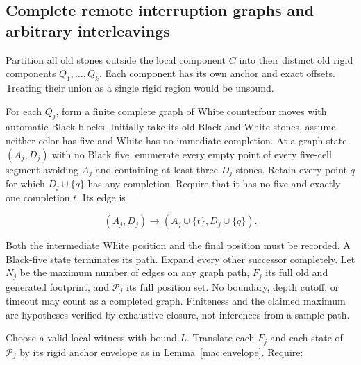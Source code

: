 \documentclass[11pt]{article}
\theoremstyle{definition}
\theoremstyle{remark}
\begin{document}
\subsection{Complete remote interruption graphs and arbitrary interleavings}\label{mac:interruption-section}

Partition all old stones outside the local component \(C\) into their distinct old rigid components \(Q_1,\ldots,Q_k\). Each component has its own anchor and exact offsets. Treating their union as a single rigid region would be unsound.

For each \(Q_j\), form a finite complete graph of White counterfour moves with automatic Black blocks. Initially take its old Black and White stones, assume neither color has five and White has no immediate completion. At a graph state \((A_j,D_j)\) with no Black five, enumerate every empty point of every five-cell segment avoiding \(A_j\) and containing at least three \(D_j\) stones. Retain every point \(q\) for which \(D_j\cup\{q\}\) has any completion. Require that it has no five and exactly one completion \(t\). Its edge is

\[
(A_j,D_j)\longrightarrow(A_j\cup\{t\},D_j\cup\{q\}).
\]

Both the intermediate White position and the final position must be recorded. A Black-five state terminates its path. Expand every other successor completely. Let \(N_j\) be the maximum number of edges on any graph path, \(F_j\) its full old and generated footprint, and \(\mathcal P_j\) its full position set. No boundary, depth cutoff, or timeout may count as a completed graph. Finiteness and the claimed maximum are hypotheses verified by exhaustive closure, not inferences from a sample path.

Choose a valid local witness with bound \(L\). Translate each \(F_j\) and each state of \(\mathcal P_j\) by its rigid anchor envelope as in Lemma~\ref{mac:envelope}. Require:
\end{document}
